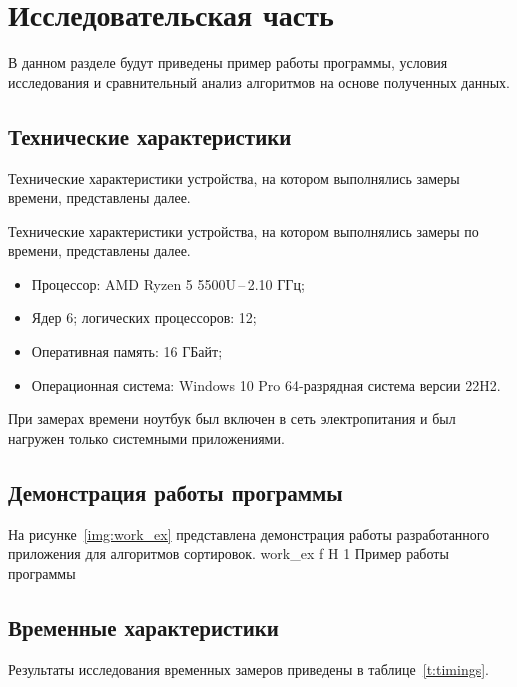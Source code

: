 \chapter{Исследовательская часть}
В данном разделе будут приведены пример работы программы, условия исследования и сравнительный анализ алгоритмов на основе полученных данных.

\section{Технические характеристики}
Технические характеристики устройства, на котором выполнялись замеры времени, представлены далее.

Технические характеристики устройства, на котором выполнялись замеры по времени, представлены далее.
\begin{itemize}
	\item Процессор: AMD Ryzen 5 5500U\,--\,2.10 ГГц;
	\item Ядер 6; логических процессоров: 12;
	\item Оперативная память: 16 ГБайт;
	\item Операционная система: Windows 10 Pro 64-разрядная система версии 22H2.
\end{itemize}

При замерах времени ноутбук был включен в сеть электропитания и был нагружен только системными приложениями.

\section{Демонстрация работы программы}

На рисунке~\ref{img:work_ex} представлена демонстрация работы разработанного приложения для алгоритмов сортировок.
{work_ex} %
{f} %
{H} %
{1\textwidth} %
{Пример работы программы} %

\section{Временные характеристики}
Результаты исследования временных замеров приведены в таблице~\ref{t:timings}.
\newpage

